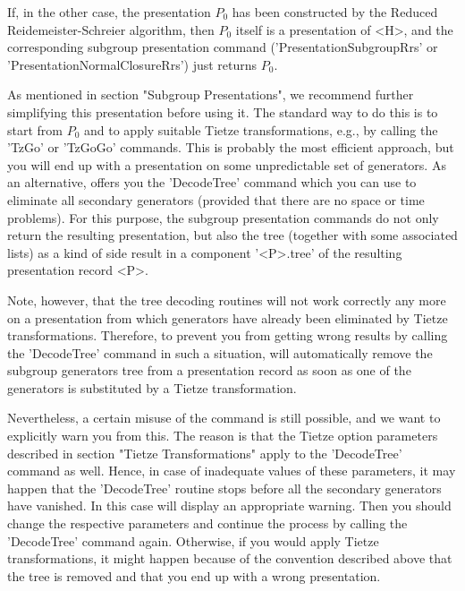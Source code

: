 If, in the other case, the presentation $P_0$ has been constructed by the
Reduced   Reidemeister-Schreier   algorithm,  then  $P_0$   itself  is  a
presentation  of <H>, and the corresponding subgroup presentation command
('PresentationSubgroupRrs'   or    'PresentationNormalClosureRrs')   just
returns $P_0$.

As  mentioned in section  "Subgroup Presentations", we  recommend further
simplifying this  presentation  before using it.  The standard  way to do
this is to start from $P_0$ and to apply suitable Tietze transformations,
e.g.,  by calling the 'TzGo' or  'TzGoGo' commands.  This is probably the
most efficient approach, but  you will end up with a presentation on some
unpredictable set of generators.   As an alternative, {\GAP}  offers  you
the  'DecodeTree' command  which you can use to  eliminate all  secondary
generators (provided that there are no space or time problems).  For this
purpose,  the  subgroup presentation  commands  do  not only  return  the
resulting  presentation, but also the tree (together with some associated
lists)  as  a  kind  of  side  result in  a component  '<P>.tree' of  the
resulting presentation record <P>.

Note,  however, that  the tree decoding  routines will not work correctly
any  more  on  a presentation  from which  generators have  already  been
eliminated  by  Tietze transformations.  Therefore, to prevent  you  from
getting wrong  results by calling  the  'DecodeTree'  command in  such  a
situation, {\GAP}  will automatically remove the subgroup generators tree
from  a  presentation  record  as  soon  as  one  of  the  generators  is
substituted by a Tietze transformation.

Nevertheless,  a certain misuse of  the command is still possible, and we
want to explicitly warn you from this.   The reason  is  that the  Tietze
option parameters described in  section "Tietze Transformations" apply to
the 'DecodeTree' command as well.  Hence, in case of inadequate values of
these  parameters,  it may  happen  that the  'DecodeTree' routine  stops
before all  the secondary generators  have vanished.  In this case {\GAP}
will  display  an  appropriate  warning.   Then  you  should  change  the
respective   parameters   and  continue  the  process   by  calling   the
'DecodeTree'  command  again.   Otherwise,  if  you  would  apply  Tietze
transformations,  it  might  happen  because  of the convention described
above that  the  tree  is  removed  and  that you end  up  with  a  wrong
presentation.

